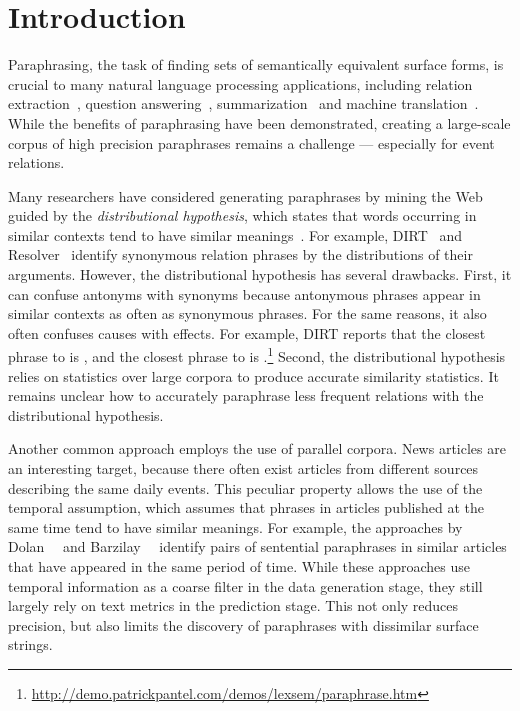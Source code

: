 \section{Introduction}

Paraphrasing, the task of finding sets of semantically equivalent
surface forms, is crucial to many natural language processing
applications, including relation extraction~\cite{bhagat2008large},
question answering~\cite{faderparaphrase},
summarization~\cite{barzilay1999information} and machine
translation~\cite{callison2006improved}. While the benefits of
paraphrasing have been demonstrated, creating a large-scale corpus of
high precision paraphrases remains a challenge --- especially for event
relations.

Many researchers have considered generating paraphrases by mining the
Web guided by the {\em distributional hypothesis}, which states that
words occurring in similar contexts tend to have similar
meanings~\cite{harris1954distributional}. For example,
DIRT~\cite{lin2001discovery} and Resolver~\cite{yates2009unsupervised}
identify synonymous relation phrases by the distributions of their
arguments. However, the distributional hypothesis has several
drawbacks. First, it can confuse antonyms with synonyms because
antonymous phrases appear in similar contexts as often as synonymous
phrases. For the same reasons, it also often confuses causes with
effects. For example, {DIRT} reports that the closest phrase to
 is , and the closest phrase to  is
.\footnote{\url{http://demo.patrickpantel.com/demos/lexsem/paraphrase.htm}}
Second, the distributional hypothesis relies on statistics over large
corpora to produce accurate similarity statistics. It remains unclear
how to accurately paraphrase less frequent relations with the
distributional hypothesis.



Another common approach employs the use of parallel corpora. News
articles are an interesting target, because there often exist articles
from different sources describing the same daily events. This peculiar
property allows the use of the temporal assumption, which assumes that
phrases in articles published at the same time tend to have similar
meanings. For example, the approaches by
Dolan~\etal~ and
Barzilay~\etal~ identify pairs of
sentential paraphrases in similar articles that have appeared in the
same period of time. While these approaches use temporal information
as a coarse filter in the data generation stage, they still largely
rely on text metrics in the prediction stage. This not only
reduces precision, but also limits the discovery of paraphrases with
dissimilar surface strings.

